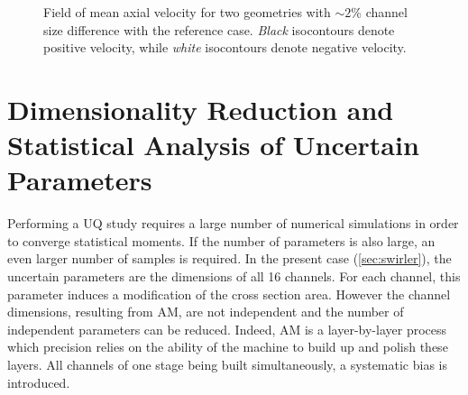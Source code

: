 \begin{figure}[!ht]
\centering
\caption{Field of mean axial velocity for two geometries with $\sim2$\% channel size difference with the reference case. \emph{Black} isocontours denote positive velocity, while \emph{white} isocontours denote negative velocity.}
\label{fig:swirler_mod_u}
\end{figure}


\section{Dimensionality Reduction and Statistical Analysis of Uncertain Parameters}\label{sec:dim}
Performing a UQ study requires a large number of numerical simulations in order to converge statistical moments. If the number of parameters is also large, an even larger number of samples is required. In the present case (\cref{sec:swirler}), the uncertain parameters are the dimensions of all 16 channels. For each channel, this parameter induces a modification of the cross section area. However the channel dimensions, resulting from AM, are not independent and the number of independent parameters can be reduced. Indeed, AM is a layer-by-layer process which precision relies on the ability of the machine to build up and polish these layers. All channels of one stage being built simultaneously, a systematic bias is introduced. 

